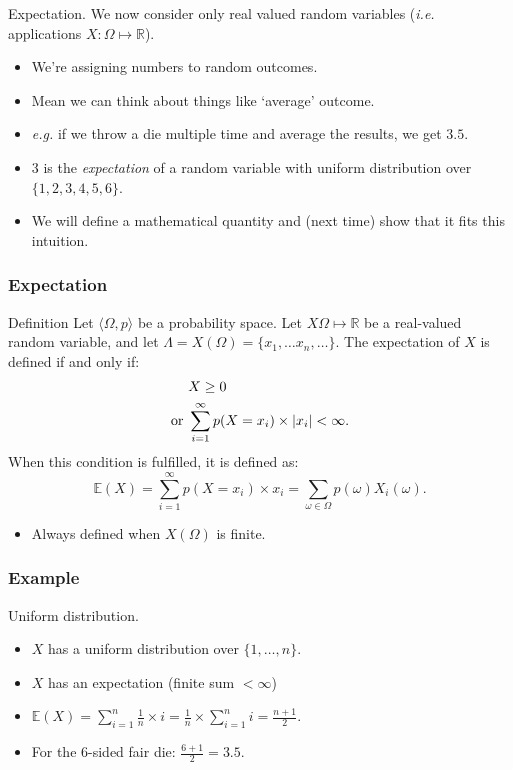 \documentclass{beamer}
\begin{document}
\begin{frame}{Expectation.}
  We now consider only real valued random variables (\emph{i.e.} applications $X: \Omega \mapsto \mathbb{R}$).

  \begin{itemize}
  \item We're assigning numbers to random outcomes.
  \item Mean we can think about things like `average' outcome.
  \item \emph{e.g.} if we throw a die multiple time and average the results, we get $3.5$.
  \item $3$ is the \emph{expectation} of a random variable with uniform distribution over $\{1,2,3,4,5,6\}$.
  \item We will define a mathematical quantity and (next time) show that it fits this intuition.
  \end{itemize}
\end{frame}

\begin{frame}
  \frametitle{Expectation}
  \begin{block}{Definition}
    Let $\langle \Omega, p \rangle$ be a probability space. Let $X \Omega \mapsto \mathbb{R}$ be a real-valued random variable, and let $\Lambda = X(\Omega) = \{x_1, \dots x_n, \dots\}$. The expectation of $X$ is defined if and only if:
    \[\begin{aligned} &X \ge 0\\\textnormal{or }&\sum^{\infty}_{i=1} p(X = x_i) \times |x_i| < \infty.\end{aligned}\]
    When this condition is fulfilled, it is defined as:
    \[\mathbb{E}(X) = \sum^{\infty}_{i=1} p(X = x_i) \times x_i = \sum_{\omega \in \Omega} p(\omega) X_i(\omega) .\]
  \end{block}
  \begin{itemize}
  \item \alert{Always defined when $X(\Omega)$ is finite.}
  \end{itemize}
\end{frame}

\begin{frame}
  \frametitle{Example}
  \begin{exampleblock}{Uniform distribution.}
    \begin{itemize}
    \item $X$ has a uniform distribution over $\{1, \dots, n\}$.
    \item $X$ has an expectation (finite sum $< \infty$)
    \item $\mathbb{E}(X) = \sum^n_{i=1} \frac{1}{n} \times i = \frac{1}{n} \times \sum^n_{i = 1} i = \frac{n+1}{2}$.     
    \item For the $6$-sided fair die: $\frac{6+1}{2} = 3.5$.
    \end{itemize}
  \end{exampleblock}
\end{frame}
\end{document}
